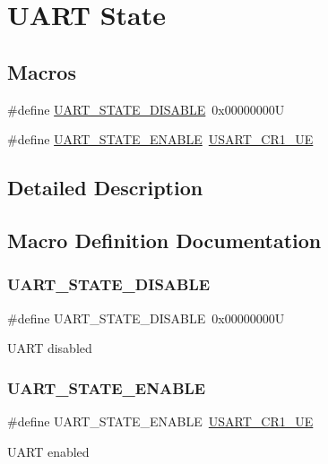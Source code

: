 \hypertarget{group___u_a_r_t___state}{}\section{U\+A\+RT State}
\label{group___u_a_r_t___state}
\subsection*{Macros}
\begin{DoxyCompactItemize}
\item 
\#define \mbox{\hyperlink{group___u_a_r_t___state_gaf32492459be708981ebc5615194cdae9}{U\+A\+R\+T\+\_\+\+S\+T\+A\+T\+E\+\_\+\+D\+I\+S\+A\+B\+LE}}~0x00000000U
\item 
\#define \mbox{\hyperlink{group___u_a_r_t___state_gab6b470dccef2a518a45554b171acff5b}{U\+A\+R\+T\+\_\+\+S\+T\+A\+T\+E\+\_\+\+E\+N\+A\+B\+LE}}~\mbox{\hyperlink{group___peripheral___registers___bits___definition_ga2bb650676aaae4a5203f372d497d5947}{U\+S\+A\+R\+T\+\_\+\+C\+R1\+\_\+\+UE}}
\end{DoxyCompactItemize}


\subsection{Detailed Description}


\subsection{Macro Definition Documentation}
\mbox{\label{group___u_a_r_t___state_gaf32492459be708981ebc5615194cdae9}} 
\subsubsection{\texorpdfstring{UART\_STATE\_DISABLE}{UART\_STATE\_DISABLE}}
{\footnotesize\ttfamily \#define U\+A\+R\+T\+\_\+\+S\+T\+A\+T\+E\+\_\+\+D\+I\+S\+A\+B\+LE~0x00000000U}

U\+A\+RT disabled \mbox{\label{group___u_a_r_t___state_gab6b470dccef2a518a45554b171acff5b}} 
\subsubsection{\texorpdfstring{UART\_STATE\_ENABLE}{UART\_STATE\_ENABLE}}
{\footnotesize\ttfamily \#define U\+A\+R\+T\+\_\+\+S\+T\+A\+T\+E\+\_\+\+E\+N\+A\+B\+LE~\mbox{\hyperlink{group___peripheral___registers___bits___definition_ga2bb650676aaae4a5203f372d497d5947}{U\+S\+A\+R\+T\+\_\+\+C\+R1\+\_\+\+UE}}}

U\+A\+RT enabled 